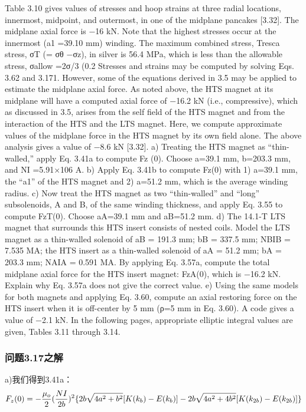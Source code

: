 Table 3.10 gives values of stresses and hoop strains at three radial locations, innermost, midpoint, and outermost, in one of the midplane pancakes [3.32]. The
midplane axial force is −16 kN. Note that the highest stresses occur at the innermost (a1 =39.10 mm) winding. The maximum combined stress, Tresca stress,
σT (= σθ −σz), in silver is 56.4 MPa, which is less than the allowable stress,
σallow =2σ/3 (0.2%
Stresses and strains may be computed by solving Eqs. 3.62 and 3.171. However,
some of the equations derived in 3.5 may be applied to estimate the midplane axial
force. As noted above, the HTS magnet at its midplane will have a computed axial
force of −16.2 kN (i.e., compressive), which as discussed in 3.5, arises from the
self field of the HTS magnet and from the interaction of the HTS and the LTS
magnet. Here, we compute approximate values of the midplane force in the HTS
magnet by its own field alone. The above analysis gives a value of −8.6 kN [3.32].
a) Treating the HTS magnet as “thin-walled,” apply Eq. 3.41a to compute
Fz
(0). Choose a=39.1 mm, b=203.3 mm, and NI =5.91×106 A.
b) Apply Eq. 3.41b to compute Fz(0) with 1) a=39.1 mm, the “a1” of the HTS
magnet and 2) a=51.2 mm, which is the average winding radius.
c) Now treat the HTS magnet as two “thin-walled” and “long” subsolenoids, A
and B, of the same winding thickness, and apply Eq. 3.55 to compute FzT(0).
Choose aA=39.1 mm and aB=51.2 mm.
d) The 14.1-T LTS magnet that surrounds this HTS insert consists of nested
coils. Model the LTS magnet as a thin-walled solenoid of aB = 191.3 mm;
bB
= 337.5 mm; NBIB = 7.535 MA; the HTS insert as a thin-walled solenoid
of aA = 51.2 mm; bA = 203.3 mm; NAIA = 0.591 MA. By applying Eq. 3.57a,
compute the total midplane axial force for the HTS insert magnet: FzA(0),
which is −16.2 kN. Explain why Eq. 3.57a does not give the correct value.
e) Using the same models for both magnets and applying Eq. 3.60, compute
an axial restoring force on the HTS insert when it is off-center by 5 mm
(ρ=5 mm in Eq. 3.60). A code gives a value of −2.1 kN.
In the following pages, appropriate elliptic integral values are given, Tables 3.11
through 3.14.


\subsubsection{问题3.17之解}

a)我们得到3.41a：
\begin{equation}
F_{z}(0)=-\frac{\mu_{o}}{2}(\frac{NI}{2b})^{2}\{2b\sqrt{4a^{2}+b^{2}}[K(k_{b})-E(k_{b})]\\
-2b\sqrt{4a^{2}+4b^{2}}[K(k_{2b})-E(k_{2b})]\}\\%
\end{equation}

